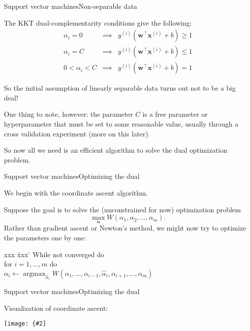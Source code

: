 \documentclass{beamer}
\renewcommand{\vec}[1]{\boldsymbol{#1}}
\DeclareMathOperator*{\argmax}{argmax}
\newcommand{\myfig}[3]{\centerline{\texttt{[image: \{\#2]}}}
    \centerline{\scriptsize #3}}
\begin{document}
\begin{frame}{Support vector machines}{Non-separable data}

  The KKT dual-complementarity conditions give the following:
  \begin{eqnarray}
    \alpha_i = 0 & \implies & y^{(i)}(\vec{w}^\top\vec{x}^{(i)}+b) \ge 1 \nonumber \\
    \alpha_i = C & \implies & y^{(i)}(\vec{w}^\top \vec{x}^{(i)}+b) \le 1 \nonumber \\
    0 < \alpha_i < C & \implies & y^{(i)}(\vec{w}^\top \vec{x}^{(i)}+b) = 1 \nonumber
  \end{eqnarray}

  So the initial assumption of linearly separable data turns out not to be a big deal!

  \medskip

  One thing to note, however: the parameter $C$ is a \alert{free
    parameter} or \alert{hyperparameter} that must be set to some
  reasonable value, usually through a cross validation experiment
  (more on this later).

  \medskip

  So now all we need is an efficient algorithm to solve the dual
  optimization problem.
  
\end{frame}


\begin{frame}{Support vector machines}{Optimizing the dual}

  We begin with the \alert{coordinate ascent} algorithm.

  \medskip

  Suppose the goal is to solve the (unconstrained for now) optimization
  problem
  \[ \max_{\vec{\alpha}} W(\alpha_1,\alpha_2,\ldots,\alpha_m) .\]
  Rather than gradient ascent or Newton's method, we might now try
  to optimize the parameters one by one:

  \begin{tabbing}
    xxx \= xxx \= \kill
    While not converged do \\
    \> for $i = 1, \ldots, m$ do \\
    \> \> $\alpha_i \leftarrow \argmax_{\hat{\alpha}_i} W(\alpha_1,
    \ldots,\alpha_{i-1},\hat{\alpha}_i,\alpha_{i+1},\ldots,\alpha_m)$
  \end{tabbing}

\end{frame}


\begin{frame}{Support vector machines}{Optimizing the dual}

  Visualization of coordinate ascent:
  \myfig{3in}{ng-coord-ascent}{Ng, CS 229 lecture notes, set 3}
  
\end{frame}
\end{document}
